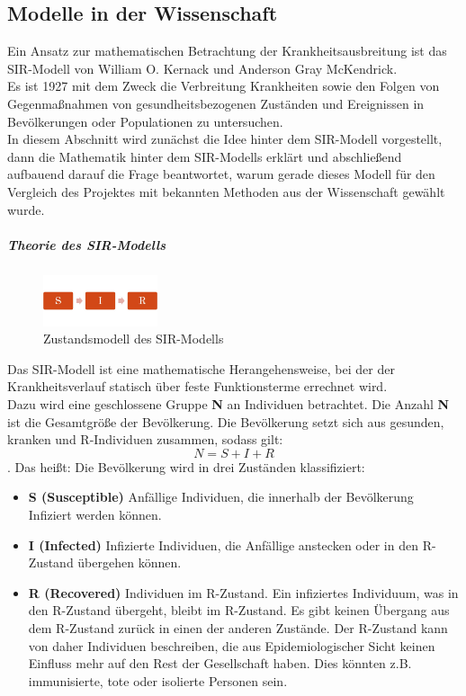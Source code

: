 \subsection{Modelle in der Wissenschaft}
Ein Ansatz zur mathematischen Betrachtung der Krankheitsausbreitung ist das SIR-Modell von William O. Kernack und Anderson Gray McKendrick.\\
Es ist 1927 mit dem Zweck die Verbreitung Krankheiten sowie den Folgen von Gegenmaßnahmen von gesundheitsbezogenen Zuständen und Ereignissen in Bevölkerungen oder Populationen zu untersuchen.\\
In diesem Abschnitt wird zunächst die Idee hinter dem SIR-Modell vorgestellt, dann die Mathematik hinter dem SIR-Modells erklärt und abschließend aufbauend darauf die Frage beantwortet, warum gerade dieses Modell für den Vergleich des Projektes mit bekannten Methoden aus der Wissenschaft gewählt wurde.
\subparagraph{Theorie des SIR-Modells}
\begin{figure}
\includegraphics[width= 0.3\textwidth]{./images/SIR-Modell.jpg}\caption{Zustandsmodell des SIR-Modells}\label{fig:SIR}
\end{figure}
Das SIR-Modell ist eine mathematische Herangehensweise, bei der der Krankheitsverlauf statisch über feste Funktionsterme errechnet wird. \\
Dazu wird eine geschlossene Gruppe \textbf{N} an Individuen betrachtet. Die Anzahl \textbf{N} ist die Gesamtgröße der Bevölkerung. Die Bevölkerung setzt sich aus gesunden, kranken und \glqq R\grqq-Individuen zusammen, sodass gilt:
\begin{equation}
N = S + I + R
\end{equation}
. Das heißt: Die Bevölkerung wird in drei Zuständen klassifiziert:
\begin{itemize}
\item \textbf{S (Susceptible)} Anfällige Individuen, die innerhalb der Bevölkerung Infiziert werden können.
\item \textbf{I (Infected)} Infizierte Individuen, die Anfällige anstecken  oder in den \glqq R\grqq -Zustand übergehen können.
\item \textbf{R (Recovered)} Individuen im \glqq R\grqq -Zustand. Ein infiziertes Individuum, was in den \glqq R\grqq -Zustand übergeht, bleibt im R-Zustand. Es gibt keinen Übergang aus dem \glqq R\grqq -Zustand zurück in einen der anderen Zustände. Der \glqq R\grqq -Zustand kann von daher Individuen beschreiben, die aus Epidemiologischer Sicht keinen Einfluss mehr auf den Rest der Gesellschaft haben. Dies könnten z.B. immunisierte, tote oder isolierte Personen sein.
\end{itemize}
